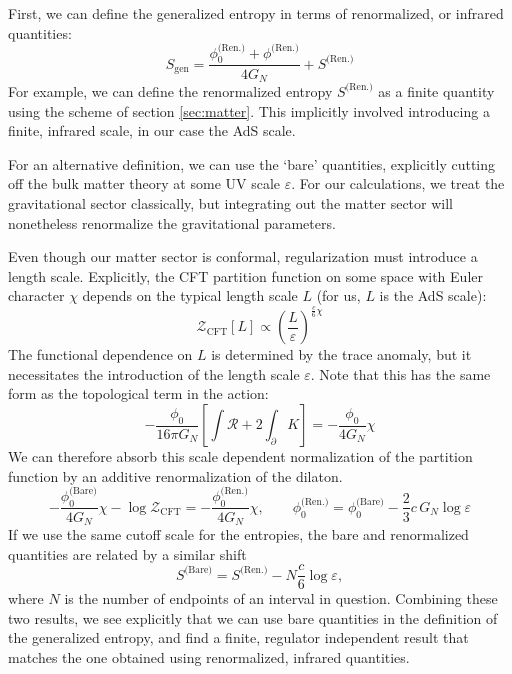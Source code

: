 \documentclass[12pt]{article}
\begin{document}
First, we can define the generalized entropy in terms of renormalized, or infrared quantities:
\begin{equation}
	S_\text{gen} = \frac{\phi_0^{\text{(Ren.)}}+\phi^{\text{(Ren.)}}}{4G_N} + S^{\text{(Ren.)}}
\end{equation}
For example, we can define the renormalized entropy $S^{\text{(Ren.)}}$ as a finite quantity using the scheme of section \ref{sec:matter}. This implicitly involved introducing a finite, infrared scale, in our case the AdS scale.

For an alternative definition, we can use the `bare' quantities, explicitly cutting off the bulk matter theory at some UV scale $\varepsilon$. For our calculations, we treat the gravitational sector classically, but integrating out the matter sector will nonetheless renormalize the gravitational parameters.





 Even though our matter sector is conformal, regularization must introduce a length scale. Explicitly, the CFT partition function on some space with Euler character $\chi$ depends on the typical length scale $L$ (for us, $L$ is the AdS scale):
\begin{equation}
	\mathcal{Z}_\text{CFT}[L] \propto \left(\frac{L}{\varepsilon}\right)^{\frac{c}{6}\chi}
\end{equation}
The functional dependence on $L$ is determined by the trace anomaly, but it necessitates the introduction of the length scale $\varepsilon$. Note that this has the same form as the topological term in the action:
\begin{equation}
	-\frac{\phi_0}{16\pi G_N}\left[\int \mathcal{R} + 2\int_\partial K\right] = -\frac{\phi_0}{4G_N}\chi
\end{equation}
We can therefore absorb this scale dependent normalization of the partition function by an additive renormalization of the dilaton.
\begin{equation}
	-\frac{\phi_0^{\text{(Bare)}}}{4G_N}\chi - \log\mathcal{Z}_\text{CFT} = -\frac{\phi_0^{\text{(Ren.)}}}{4G_N}\chi, \qquad \phi_0^{\text{(Ren.)}} =\phi_0^{\text{(Bare)}} - \frac{2}{3}c\, G_N  \log\varepsilon
\end{equation}
If we use the same cutoff scale for the entropies, the bare and renormalized quantities are related by a similar shift
\begin{equation}
	S^{\text{(Bare)}} = S^{\text{(Ren.)}} - N \frac{c}{6}\log \varepsilon,
\end{equation}
where $N$ is the number of endpoints of an interval in question. Combining these two results, we see explicitly that we can use bare quantities in the definition of the generalized entropy, and find a finite, regulator independent result that matches the one obtained using renormalized, infrared quantities.
\end{document}
